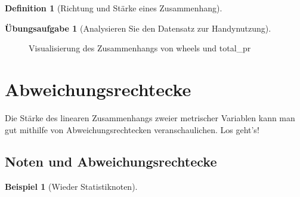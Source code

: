 \documentclass[
  a4paper,
  DIV=11]{scrreprt}
\theoremstyle{definition}
\newtheorem{exercise}{Übungsaufgabe}[chapter]
\theoremstyle{definition}
\newtheorem{example}{Beispiel}[chapter]
\theoremstyle{definition}
\newtheorem{definition}{Definition}[chapter]
\theoremstyle{remark}
\begin{document}
\begin{definition}[Richtung und Stärke eines
Zusammenhang]
\begin{exercise}[Analysieren Sie den Datensatz zur
Handynutzung]
\begin{figure}
\begin{minipage}{0.50\linewidth}
{}


\end{minipage}%
%
\begin{minipage}{0.50\linewidth}



\end{minipage}%

\caption{\label{fig-zshg}Visualisierung des Zusammenhangs von wheels und
total\_pr}

\end{figure}%

\section{Abweichungsrechtecke}\label{sec-cov}

Die Stärke des linearen Zusammenhangs zweier metrischer Variablen kann
man gut mithilfe von Abweichungsrechtecken veranschaulichen. Los geht's!

\subsection{Noten und
Abweichungsrechtecke}\label{noten-und-abweichungsrechtecke}

\begin{example}[Wieder
Statistiknoten]\protect\hypertarget{exm-noten2}{}\label{exm-noten2}


\end{example}
\end{exercise}
\end{definition}
\end{document}
